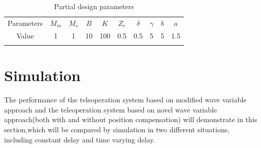 \begin{table}[htp]%
    \centering
    \caption{Partial design parameters}
    \label{tab1}
    \begin{tabular}{ccccc ccccc}%
        \hline\hline\noalign{\smallskip}
        Parameters & $M_m$ & $M_s$ & $B$ & $K$ & $Z_e$ & $\delta$ & $\gamma$ & $b$ & $a$ \\
        \noalign{\smallskip}\hline\noalign{\smallskip}
        Value      & 1     & 1     & 10  & 100 & 0.5   & 0.5      & 5        & 5   & 1.5 \\
        \noalign{\smallskip}\hline
    \end{tabular}
\end{table}




\section{Simulation}
The performance of the teleoperation system based on modified wave variable approach
and the teleoperation system based on novel wave variable approach(both with and without position compensation)
will demonstrate in this section,which
will be compared by simulation in two different situations,
including constant delay and time varying delay.


